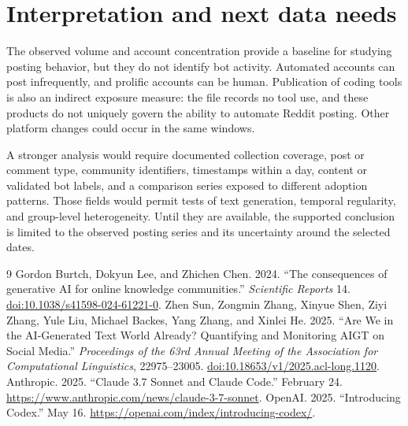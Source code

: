 \documentclass[11pt]{article}
\begin{document}
\section{Interpretation and next data needs}
The observed volume and account concentration provide a baseline for studying posting behavior, but they do not identify bot activity. Automated accounts can post infrequently, and prolific accounts can be human. Publication of coding tools is also an indirect exposure measure: the file records no tool use, and these products do not uniquely govern the ability to automate Reddit posting. Other platform changes could occur in the same windows.

A stronger analysis would require documented collection coverage, post or comment type, community identifiers, timestamps within a day, content or validated bot labels, and a comparison series exposed to different adoption patterns. Those fields would permit tests of text generation, temporal regularity, and group-level heterogeneity. Until they are available, the supported conclusion is limited to the observed posting series and its uncertainty around the selected dates.

\begin{thebibliography}{9}
 Gordon Burtch, Dokyun Lee, and Zhichen Chen. 2024. ``The consequences of generative AI for online knowledge communities.'' \emph{Scientific Reports} 14. \href{https://doi.org/10.1038/s41598-024-61221-0}{doi:10.1038/s41598-024-61221-0}.
 Zhen Sun, Zongmin Zhang, Xinyue Shen, Ziyi Zhang, Yule Liu, Michael Backes, Yang Zhang, and Xinlei He. 2025. ``Are We in the AI-Generated Text World Already? Quantifying and Monitoring AIGT on Social Media.'' \emph{Proceedings of the 63rd Annual Meeting of the Association for Computational Linguistics}, 22975--23005. \href{https://doi.org/10.18653/v1/2025.acl-long.1120}{doi:10.18653/v1/2025.acl-long.1120}.
 Anthropic. 2025. ``Claude 3.7 Sonnet and Claude Code.'' February 24. \url{https://www.anthropic.com/news/claude-3-7-sonnet}.
 OpenAI. 2025. ``Introducing Codex.'' May 16. \url{https://openai.com/index/introducing-codex/}.
\end{thebibliography}
\end{document}
